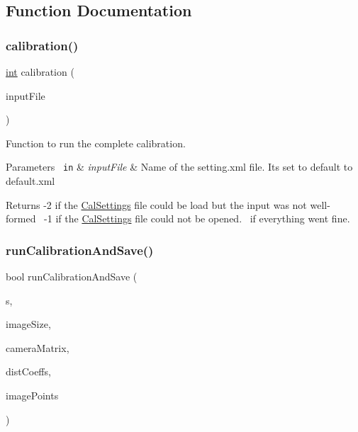 \subsection{Function Documentation}
\mbox{\label{calibration_8hh_aad0d20455c4c17ca2922fec15835fe94}} 
\subsubsection{\texorpdfstring{calibration()}{calibration()}}
{\footnotesize\ttfamily \mbox{\hyperlink{draw_8hh_aa620a13339ac3a1177c86edc549fda9b}{int}} calibration (\begin{DoxyParamCaption}\item[{string}]{input\+File }\end{DoxyParamCaption})}



Function to run the complete calibration. 


\begin{DoxyParams}[1]{Parameters}
\mbox{\texttt{ in}}  & {\em input\+File} & Name of the setting.\+xml file. It\textquotesingle{}s set to default to default.\+xml\\
\hline
\end{DoxyParams}
\begin{DoxyReturn}{Returns}
-\/2 if the \mbox{\hyperlink{class_cal_settings}{Cal\+Settings}} file could be load but the input was not well-\/formed~\newline
 -\/1 if the \mbox{\hyperlink{class_cal_settings}{Cal\+Settings}} file could not be opened.~ if everything went fine. 
\end{DoxyReturn}
\mbox{\label{calibration_8hh_a4195037da024926ac4f645bd09700052}} 
\subsubsection{\texorpdfstring{runCalibrationAndSave()}{runCalibrationAndSave()}}
{\footnotesize\ttfamily bool run\+Calibration\+And\+Save (\begin{DoxyParamCaption}\item[{\mbox{\hyperlink{class_cal_settings}{Cal\+Settings}} \&}]{s,  }\item[{Size}]{image\+Size,  }\item[{Mat \&}]{camera\+Matrix,  }\item[{Mat \&}]{dist\+Coeffs,  }\item[{vector$<$ vector$<$ Point2f $>$ $>$}]{image\+Points }\end{DoxyParamCaption})}



